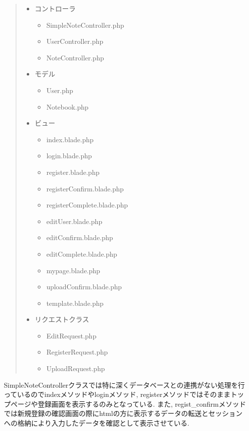 \documentclass[submit,techrep]{ipsj}
\begin{document}
\begin{quote}
 \begin{itemize}
  \item コントローラ
   \begin{itemize}
   \item SimpleNoteController.php
   \item UserController.php
   \item NoteController.php
   \end{itemize}
  \item モデル
   \begin{itemize}
    \item User.php
    \item Notebook.php
   \end{itemize}
  \item ビュー
   \begin{itemize}
    \item index.blade.php
    \item login.blade.php
    \item register.blade.php
    \item registerConfirm.blade.php
    \item registerComplete.blade.php
    \item editUser.blade.php
    \item editConfirm.blade.php
    \item editComplete.blade.php
    \item mypage.blade.php
    \item uploadConfirm.blade.php
    \item template.blade.php
   \end{itemize}
   \item リクエストクラス
   \begin{itemize}
    \item EditRequest.php
    \item RegisterRequest.php
    \item UploadRequest.php
   \end{itemize}
 \end{itemize}
\end{quote}

SimpleNoteControllerクラスでは特に深くデータベースとの連携がない処理を行っているのでindexメソッドやloginメソッド, registerメソッドではそのままトップページや登録画面を表示するのみとなっている. また, regist\_confirmメソッドでは新規登録の確認画面の際にhtmlの方に表示するデータの転送とセッションへの格納により入力したデータを確認として表示させている. 
\end{document}
